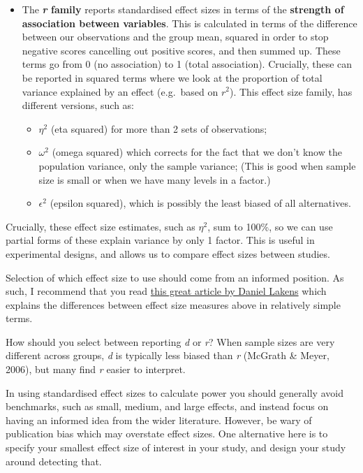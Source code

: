 \documentclass[
]{book}
\providecommand{\tightlist}{%
  \setlength{\itemsep}{0pt}\setlength{\parskip}{0pt}}
\begin{document}
\begin{itemize}
\tightlist
\item
  The \textbf{\emph{r} family} reports standardised effect sizes in terms of the \textbf{strength of association between variables}. This is calculated in terms of the difference between our observations and the group mean, squared in order to stop negative scores cancelling out positive scores, and then summed up. These terms go from 0 (no association) to 1 (total association). Crucially, these can be reported in squared terms where we look at the proportion of total variance explained by an effect (e.g.~based on \(r^2\)). This effect size family, has different versions, such as:

  \begin{itemize}
  \tightlist
  \item
    \(\eta^2\) (eta squared) for more than 2 sets of observations;
  \item
    \(\omega^2\) (omega squared) which corrects for the fact that we don't know the population variance, only the sample variance; (This is good when sample size is small or when we have many levels in a factor.)
  \item
    \(\epsilon^2\) (epsilon squared), which is possibly the least biased of all alternatives.
  \end{itemize}
\end{itemize}

Crucially, these effect size estimates, such as \(\eta^2\), sum to 100\%, so we can use partial forms of these explain variance by only 1 factor. This is useful in experimental designs, and allows us to compare effect sizes between studies.

Selection of which effect size to use should come from an informed position. As such, I recommend that you read \href{https://www.frontiersin.org/articles/10.3389/fpsyg.2013.00863/full\#h3}{this great article by Daniel Lakens} which explains the differences between effect size measures above in relatively simple terms.

How should you select between reporting \emph{d} or \emph{r}? When sample sizes are very different across groups, \emph{d} is typically less biased than \emph{r} (McGrath \& Meyer, 2006), but many find \emph{r} easier to interpret.

In using standardised effect sizes to calculate power you should generally avoid benchmarks, such as small, medium, and large effects, and instead focus on having an informed idea from the wider literature. However, be wary of publication bias which may overstate effect sizes. One alternative here is to specify your smallest effect size of interest in your study, and design your study around detecting that.
\end{document}

